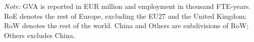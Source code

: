 \begin{table}[!t]
\par\smallskip
\begin{minipage}{\textwidth}
\scriptsize
\textit{Note:} GVA is reported in EUR million and employment in thousand FTE-years. RoE denotes the rest of Europe, excluding the EU27 and the United Kingdom; RoW denotes the rest of the world. China and Others are subdivisions of RoW; Others excludes China.
\end{minipage}

\caption{Cumulative 25-year economic impacts of a 1 GW EU-27 OWF by effect type and component.}
\label{tab:summary_indicators_compcols_total}
\end{table}

